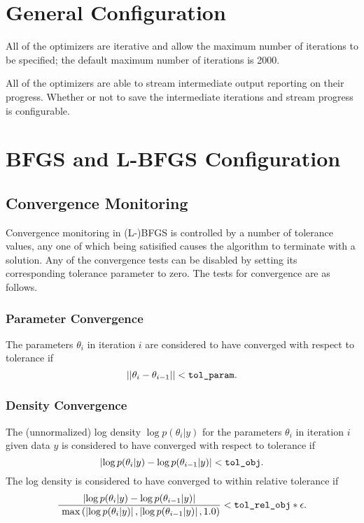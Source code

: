 \section{General Configuration}

All of the optimizers are iterative and allow the maximum number of
iterations to be specified;  the default maximum number of iterations
is 2000.

All of the optimizers are able to stream intermediate output reporting
on their progress.  Whether or not to save the intermediate iterations
and stream progress is configurable.

\section{BFGS and L-BFGS Configuration}

\subsection{Convergence Monitoring}

Convergence monitoring in (L-)BFGS is controlled by a number of
tolerance values, any one of which being satisified causes the
algorithm to terminate with a solution. Any of the convergence tests
can be disabled by setting its corresponding tolerance parameter to
zero.  The tests for convergence are as follows.

\subsubsection{Parameter Convergence}

The parameters $\theta_i$ in iteration $i$ are considered to have
converged with respect to tolerance  if
%
\[
|| \theta_{i} - \theta_{i-1} || < \mbox{\code{tol\_param}}.
\]


\subsubsection{Density Convergence}
%
The (unnormalized) log density
$\log p(\theta_{i}|y)$ for the parameters $\theta_i$ in iteration $i$
given data $y$ is considered to have converged with
respect to tolerance  if
%
\[
\left| \log p(\theta_{i}|y) - \log p(\theta_{i-1}|y) \right| <
\mbox{\code{tol\_obj}}.
\]
%
The log density is considered to have converged to within
relative tolerance  if
%
\[
\frac{\left| \log p(\theta_{i}|y) - \log p(\theta_{i-1}|y) \right|}{\
  \max\left(\left| \log p(\theta_{i}|y)\right|,\left| \log
      p(\theta_{i-1}|y)\right|,1.0\right)}
 < \mbox{\code{tol\_rel\_obj}} * \epsilon.
\]
%


